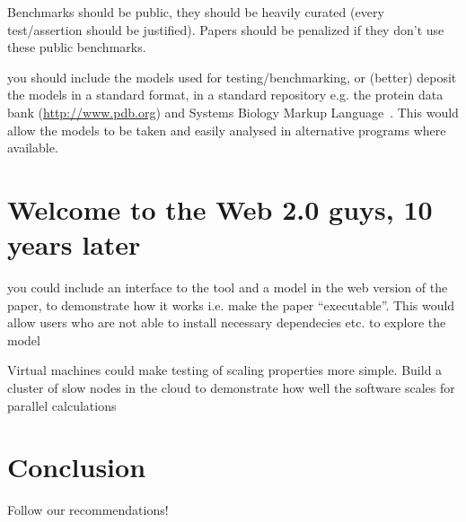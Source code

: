 \documentclass[conference]{IEEEtran}
\begin{document}
Benchmarks should be public, they should be heavily curated (every
test/assertion should be justified). Papers should be penalized if
they don't use these public benchmarks.

you should include the models used for testing/benchmarking, or
(better) deposit the models in a standard format, in a standard
repository e.g. the protein data bank (\url{http://www.pdb.org}) and
Systems Biology Markup Language~\cite{Hucka2003,Chaouiya2013}. This
would allow the models to be taken and easily analysed in alternative
programs where available.

\section{Welcome to the Web 2.0 guys, 10 years later} 

you could include an interface to the tool and a model in the web
version of the paper, to demonstrate how it works i.e. make the paper
``executable''. This would allow users who are not able to install
necessary dependecies etc. to explore the model \cite{Hall2014}

Virtual machines could make testing of scaling properties more simple. 
Build a cluster of slow nodes in the cloud to demonstrate how well the
software scales for parallel calculations


\section{Conclusion}
Follow our recommendations!




\end{document}
